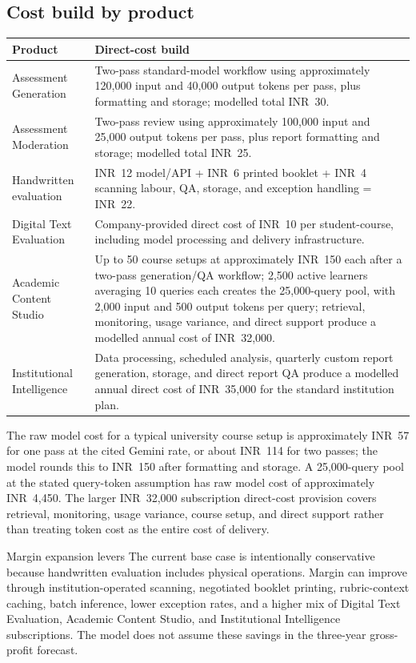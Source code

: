 \documentclass[11pt,a4paper]{article}
\newcommand{\rs}{INR}
\begin{document}
\subsection{Cost build by product}

\begin{tabularx}{\textwidth}{L{0.30\textwidth}Y}
\toprule
\textbf{Product} & \textbf{Direct-cost build} \\
\midrule
Assessment Generation & Two-pass standard-model workflow using approximately 120,000 input and 40,000 output tokens per pass, plus formatting and storage; modelled total \rs\ 30. \\
Assessment Moderation & Two-pass review using approximately 100,000 input and 25,000 output tokens per pass, plus report formatting and storage; modelled total \rs\ 25. \\
Handwritten evaluation & \rs\ 12 model/API + \rs\ 6 printed booklet + \rs\ 4 scanning labour, QA, storage, and exception handling = \rs\ 22. \\
Digital Text Evaluation & Company-provided direct cost of \rs\ 10 per student-course, including model processing and delivery infrastructure. \\
Academic Content Studio & Up to 50 course setups at approximately \rs\ 150 each after a two-pass generation/QA workflow; 2,500 active learners averaging 10 queries each creates the 25,000-query pool, with 2,000 input and 500 output tokens per query; retrieval, monitoring, usage variance, and direct support produce a modelled annual cost of \rs\ 32,000. \\
Institutional Intelligence & Data processing, scheduled analysis, quarterly custom report generation, storage, and direct report QA produce a modelled annual direct cost of \rs\ 35,000 for the standard institution plan. \\
\bottomrule
\end{tabularx}

The raw model cost for a typical university course setup is approximately \rs\ 57 for one pass at the cited Gemini rate, or about \rs\ 114 for two passes; the model rounds this to \rs\ 150 after formatting and storage. A 25,000-query pool at the stated query-token assumption has raw model cost of approximately \rs\ 4,450. The larger \rs\ 32,000 subscription direct-cost provision covers retrieval, monitoring, usage variance, course setup, and direct support rather than treating token cost as the entire cost of delivery.

\begin{callout}{Margin expansion levers}
The current base case is intentionally conservative because handwritten evaluation includes physical operations. Margin can improve through institution-operated scanning, negotiated booklet printing, rubric-context caching, batch inference, lower exception rates, and a higher mix of Digital Text Evaluation, Academic Content Studio, and Institutional Intelligence subscriptions. The model does not assume these savings in the three-year gross-profit forecast.
\end{callout}
\end{document}
